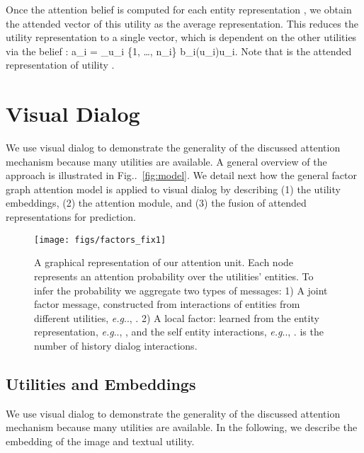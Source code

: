 \documentclass[10pt,twocolumn,letterpaper]{article}
\makeatletter
\newcommand{\beas}{}
\def\@onedot{\ifx\@let@token.\else.\null\fi\xspace}
\DeclareRobustCommand\onedot{\futurelet\@let@token\@onedot}
\newcommand{\figref}[1]{Fig\onedot~\ref{#1}}
\def\eg{\emph{e.g}\onedot} \def\Eg{\emph{E.g}\onedot}
\makeatother
\begin{document}
Once the attention belief   is computed for each entity representation , we obtain the attended vector of this utility as the average representation. This reduces the utility representation to a single vector, which is dependent on the other utilities via the belief : \beas
 a_i = \sum_{u_i \in \{1, \ldots, n_i\}} b_i(u_i)\cdot \hat u_i.
 \eeas
Note that  is the attended representation of utility . 







\section{Visual Dialog}
\label{sec:visdial}
We use visual dialog to demonstrate the generality of the discussed attention mechanism because many utilities are available. A general overview of the approach is illustrated in \figref{fig:model}. 
We  detail next how the general factor graph attention model is applied to visual dialog by describing (1) the utility embeddings, (2) the attention module, and (3) the fusion of attended representations for prediction.  

\begin{figure}[t]

\centering
\texttt{[image: figs/factors\_fix1]}
\vspace{-0.7cm}
\caption[]{{\small A graphical representation of our attention unit. Each node represents an attention probability over the utilities' entities. To infer the probability we aggregate two types of messages: 1) A joint factor message, constructed from interactions of entities from different utilities, \eg, . 2) A local factor: learned from the entity representation, \eg, , and the self entity interactions, \eg, .  is the number of history dialog interactions. }}
\label{fig:factors}
\vspace{-0.5cm}
\end{figure}







\iffalse

\subsection{Utilities and Embeddings}
\label{sec:modals}

We use visual dialog to demonstrate the generality of the discussed attention mechanism because many utilities are available. In the following, we describe the embedding of the image and textual utility. 
\end{document}
